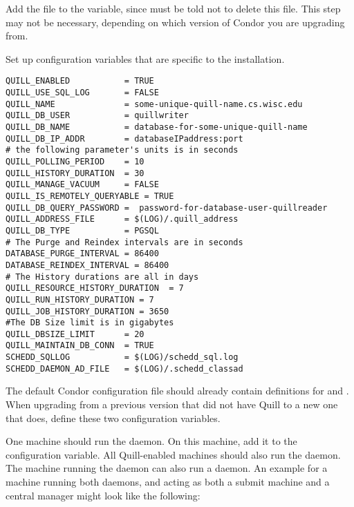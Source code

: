 \begin{description}
\item Add the file  to the 
   variable, since  must
  be told not to delete this file.
  This step may not be necessary, depending on which version of Condor 
  you are upgrading from. 
 
\item Set up configuration variables that are specific
  to the installation.
\footnotesize
\begin{verbatim}
QUILL_ENABLED           = TRUE
QUILL_USE_SQL_LOG       = FALSE
QUILL_NAME              = some-unique-quill-name.cs.wisc.edu
QUILL_DB_USER           = quillwriter
QUILL_DB_NAME           = database-for-some-unique-quill-name
QUILL_DB_IP_ADDR        = databaseIPaddress:port
# the following parameter's units is in seconds
QUILL_POLLING_PERIOD    = 10
QUILL_HISTORY_DURATION 	= 30
QUILL_MANAGE_VACUUM     = FALSE
QUILL_IS_REMOTELY_QUERYABLE = TRUE
QUILL_DB_QUERY_PASSWORD =  password-for-database-user-quillreader
QUILL_ADDRESS_FILE      = $(LOG)/.quill_address
QUILL_DB_TYPE           = PGSQL
# The Purge and Reindex intervals are in seconds
DATABASE_PURGE_INTERVAL	= 86400
DATABASE_REINDEX_INTERVAL = 86400
# The History durations are all in days 
QUILL_RESOURCE_HISTORY_DURATION  = 7
QUILL_RUN_HISTORY_DURATION = 7
QUILL_JOB_HISTORY_DURATION = 3650
#The DB Size limit is in gigabytes
QUILL_DBSIZE_LIMIT      = 20
QUILL_MAINTAIN_DB_CONN  = TRUE
SCHEDD_SQLLOG           = $(LOG)/schedd_sql.log
SCHEDD_DAEMON_AD_FILE   = $(LOG)/.schedd_classad

\end{verbatim}
\normalsize

\end{description}

The default Condor configuration file should already contain definitions
for  and .  
When upgrading from a previous version that did not have Quill to
a new one that does, define these two configuration variables.

One machine should run the  daemon.  
On this machine, add it to the  configuration variable.
All Quill-enabled machines should also run the  daemon.
The machine running the  daemon can also 
run a  daemon.  An example 
for a machine running both daemons,
and acting as both a submit machine and a central manager might 
look like the following:

